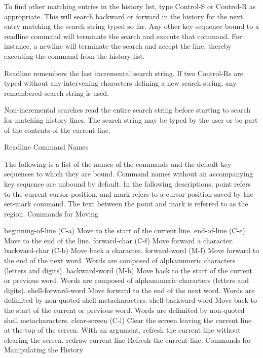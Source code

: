 To find other matching entries in the history list, type Control-S or Control-R as appropriate. This will search backward or forward in the history for the next entry matching the search string typed so far. Any other key sequence bound to a readline command will terminate the search and execute that command. For instance, a newline will terminate the search and accept the line, thereby executing the command from the history list.

Readline remembers the last incremental search string. If two Control-Rs are typed without any intervening characters defining a new search string, any remembered search string is used.

Non-incremental searches read the entire search string before starting to search for matching history lines. The search string may be typed by the user or be part of the contents of the current line.

Readline Command Names

The following is a list of the names of the commands and the default key sequences to which they are bound. Command names without an accompanying key sequence are unbound by default. In the following descriptions, point refers to the current cursor position, and mark refers to a cursor position saved by the set-mark command. The text between the point and mark is referred to as the region.
Commands for Moving

beginning-of-line (C-a)
Move to the start of the current line.
end-of-line (C-e)
Move to the end of the line.
forward-char (C-f)
Move forward a character.
backward-char (C-b)
Move back a character.
forward-word (M-f)
Move forward to the end of the next word. Words are composed of alphanumeric characters (letters and digits).
backward-word (M-b)
Move back to the start of the current or previous word. Words are composed of alphanumeric characters (letters and digits).
shell-forward-word
Move forward to the end of the next word. Words are delimited by non-quoted shell metacharacters.
shell-backward-word
Move back to the start of the current or previous word. Words are delimited by non-quoted shell metacharacters.
clear-screen (C-l)
Clear the screen leaving the current line at the top of the screen. With an argument, refresh the current line without clearing the screen.
redraw-current-line
Refresh the current line.
Commands for Manipulating the History

